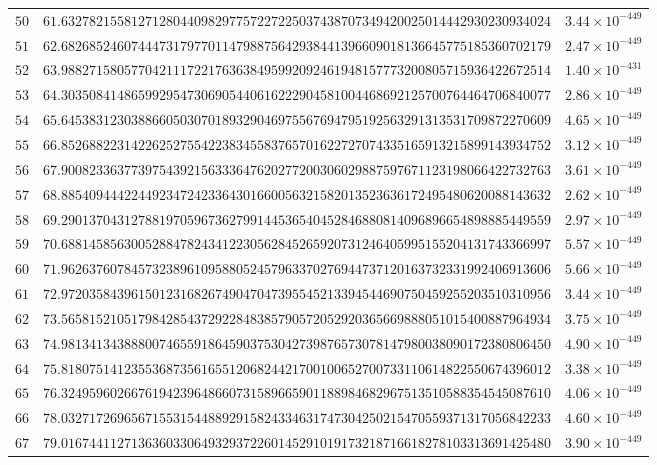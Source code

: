 \documentclass[12pt,reqno]{amsart}
\theoremstyle{remark}
\begin{document}
\begin{longtable}{clc}
$50$ & $61.6327821558127128044098297757227225037438707349420025014442930230934024$ & $3.44\times 10^{-449}$ \\
$51$ & $62.6826852460744473179770114798875642938441396609018136645775185360702179$ & $2.47\times 10^{-449}$ \\
$52$ & $63.9882715805770421117221763638495992092461948157773200805715936422672514$ & $1.40\times 10^{-431}$ \\
$53$ & $64.3035084148659929547306905440616222904581004468692125700764464706840077$ & $2.86\times 10^{-449}$ \\
$54$ & $65.6453831230388660503070189329046975567694795192563291313531709872270609$ & $4.65\times 10^{-449}$ \\
$55$ & $66.8526882231422625275542238345583765701622727074335165913215899143934752$ & $3.12\times 10^{-449}$ \\
$56$ & $67.9008233637739754392156333647620277200306029887597671123198066422732763$ & $3.61\times 10^{-449}$ \\
$57$ & $68.8854094442244923472423364301660056321582013523636172495480620088143632$ & $2.62\times 10^{-449}$ \\
$58$ & $69.2901370431278819705967362799144536540452846880814096896654898885449559$ & $2.97\times 10^{-449}$ \\
$59$ & $70.6881458563005288478243412230562845265920731246405995155204131743366997$ & $5.57\times 10^{-449}$ \\
$60$ & $71.9626376078457323896109588052457963370276944737120163732331992406913606$ & $5.66\times 10^{-449}$ \\
$61$ & $72.9720358439615012316826749047047395545213394544690750459255203510310956$ & $3.44\times 10^{-449}$ \\
$62$ & $73.5658152105179842854372922848385790572052920365669888051015400887964934$ & $3.75\times 10^{-449}$ \\
$63$ & $74.9813413438880074655918645903753042739876573078147980038090172380806450$ & $4.90\times 10^{-449}$ \\
$64$ & $75.8180751412355368735616551206824421700100652700733110614822550674396012$ & $3.38\times 10^{-449}$ \\
$65$ & $76.3249596026676194239648660731589665901188984682967513510588354545087610$ & $4.06\times 10^{-449}$ \\
$66$ & $78.0327172696567155315448892915824334631747304250215470559371317056842233$ & $4.60\times 10^{-449}$ \\
$67$ & $79.0167441127136360330649329372260145291019173218716618278103313691425480$ & $3.90\times 10^{-449}$ \\

\end{longtable}
\end{document}
